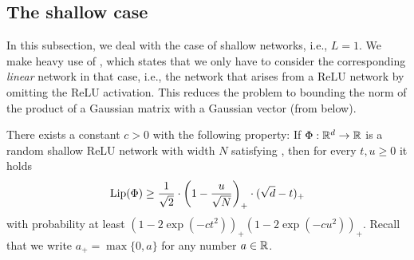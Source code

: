 \subsection{The shallow case}\label{sec:low_bound_shallow}
In this subsection, we deal with the case of shallow networks, i.e., $L=1$. 
We make heavy use of , which states that we only have to consider the corresponding \emph{linear} network in that case, 
i.e., the network that arises from a ReLU network by omitting the ReLU activation. 
This reduces the problem to bounding the norm of the product of a Gaussian matrix with a Gaussian vector (from below). 
\begin{theorem}\label{thm:shallow_low_bound_2}
There exists a constant $c>0$ with the following property: If $\Phi:\mathbb{R}^d \to \mathbb{R}$ is a random shallow ReLU network with width $N$ satisfying , then for every $t,u \geq 0$ it holds
\begin{equation*}
\operatorname{Lip}(\Phi) \geq \frac{1}{\sqrt{2}} \cdot \left(1 - \frac{u}{\sqrt{N}}\right)_+  \cdot (\sqrt{d} - t)_+
\end{equation*}
with probability at least $(1-2\exp(-ct^2))_+(1-2\exp(-cu^2))_+$. Recall that we write $a_+ = \max\{0,a\}$ for any number $a \in \mathbb{R}$.
\end{theorem}
